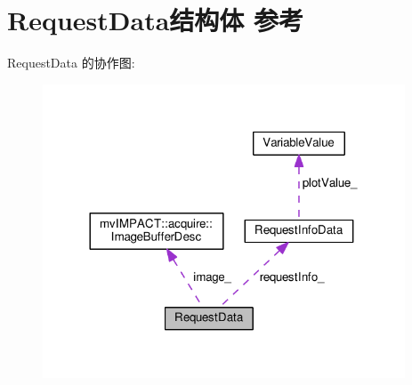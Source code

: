 \hypertarget{struct_request_data}{\section{Request\+Data结构体 参考}
\label{struct_request_data}
}


Request\+Data 的协作图\+:
\nopagebreak
\begin{figure}[H]
\begin{center}
\leavevmode
\includegraphics[width=305pt]{struct_request_data__coll__graph}
\end{center}
\end{figure}
